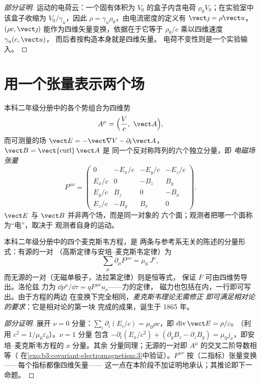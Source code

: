 \begin{proof}[部分证明]
运动的电荷云：一个固有体积为 $V_0$ 的盒子内含电荷 $\rho_0
V_0$；在实验室中该盒子收缩为 $V_0/\gamma_u$，因此 $\rho =
\gamma_u\rho_0$，由电流密度的定义有 $\vect\jmath = \rho\vect u$。
$(\rho c, \vect\jmath)$ 能作为四维矢量变换，依据在于它等于
$\rho_0/c$ 乘以四维速度 $\gamma_u(c, \vect u)$，
而后者按构造本身就是四维矢量。
电荷不变性则是一个实验输入。
\end{proof}

\section{用一个张量表示两个场}

\begin{definition}[四维势与电磁场张量]\label{def:b3:covariant-electromagnetism:tensor}
本科二年级分册中的各个势组合为四维势
\[
A^\mu = \Big(\frac{V}{c},\ \vect A\Big) ,
\]
而可测量的场 $\vect E = -\vect\nabla V -
\partial_t\vect A$，$\vect B = \operatorname{\vect{curl}}\vect A$ 是
同一个反对称阵列的六个独立分量，即
\emph{电磁场张量}
\[
F^{\mu\nu} =
\begin{pmatrix}
0 & -E_x/c & -E_y/c & -E_z/c\\
E_x/c & 0 & -B_z & B_y\\
E_y/c & B_z & 0 & -B_x\\
E_z/c & -B_y & B_x & 0
\end{pmatrix} .
\]
$\vect E$ 与 $\vect B$ 并非两个场，而是同一对象的
六个面；观测者把哪一个面称为“电”，取决于
观测者自身的运动。
\end{definition}

\begin{theorem}[麦克斯韦方程组的协变形式]\label{thm:b3:covariant-electromagnetism:maxwell}
本科二年级分册中的四个麦克斯韦方程，是
两条与参考系无关的陈述的分量形式：有源的一对
（高斯定律与安培–麦克斯韦定律）为
\[
\sum_\mu \partial_\mu F^{\mu\nu} = \mu_0\,J^\nu ,
\]
而无源的一对（无磁单极子，法拉第定律）则是恒等式，
保证 $F$ 可由四维势导出。洛伦兹
力为 $\dd p^\mu/\dd\tau = qF^{\mu\nu}u_\nu$——力的定律，
磁力也包括在内，一行即可写出。由于方程的两边
在变换下完全相同，\emph{麦克斯韦理论无需修正
即可满足相对论的要求}：它是相对论的第一块
完成的成果，诞生于 1865 年。
\end{theorem}

\begin{proof}[部分证明]
展开 $\nu = 0$ 分量：$\sum_i\partial_i(E_i/c) =
\mu_0\rho c$，即 $\operatorname{div}\vect E = \rho/\varepsilon_0$
（利用 $c^2 = 1/\mu_0\varepsilon_0$）。$\nu = 1$ 分量
包含 $-\partial_t(E_x/c^2) + (\partial_yB_z - \partial_zB_y)
= \mu_0 j_x$，即安培–麦克斯韦方程的 $x$ 分量。其余
分量同理；无源的一对即
$A^\mu$ 的交叉二阶导数相等（
在\cref{exo:b3:covariant-electromagnetism:3}中验证）。$F^{\mu\nu}$
按（二指标）张量变换——每个指标都像四维矢量——
这一点在本阶段不加证明地承认；其推论即下一命题。
\end{proof}

